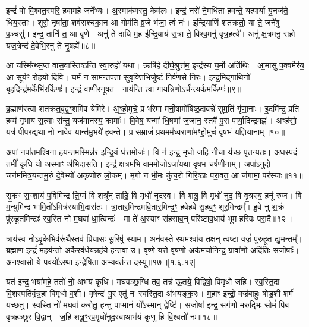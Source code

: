 इन्द्रं॑ वो वि॒श्वत॒स्परि॒ हवा॑महे॒ जने᳚भ्यः। अ॒स्माक॑मस्तु॒ केव॑लः। इन्द्रं॒ नरो॑ ने॒मधि॑ता हवन्ते॒ यत्पार्या॑ यु॒नज॑ते॒ धिय॒स्ताः। शूरो॒ नृषा॑ता॒ शव॑सश्चका॒न आ गोम॑ति व्र॒जे भ॑जा॒ त्वं नः॑। इ॒न्द्रि॒याणि॑ शतक्रतो॒ या ते॒ जने॑षु प॒ञ्चसु॑। इन्द्र॒ तानि॑ त॒ आ वृ॑णे। अनु॑ ते दायि म॒ह इ॑न्द्रि॒याय॑ स॒त्रा ते॒ विश्व॒मनु॑ वृत्र॒हत्ये᳚। अनु॑ क्ष॒त्रमनु॒ सहो॑ यज॒त्रेन्द्र॑ दे॒वेभि॒रनु॑ ते नृ॒षह्ये᳚॥८॥

आ यस्मि᳚न्थ्स॒प्त वा॑स॒वास्तिष्ठ॑न्ति स्वा॒रुहो॑ यथा। ऋषि॑र्\mbox{}ह दीर्घ॒श्रुत्त॑म॒ इन्द्र॑स्य घ॒र्मो अति॑थिः। आ॒मासु॑ प॒क्वमैर॑य॒ आ सूर्यꣳ॑ रोहयो दि॒वि। घ॒र्मं न साम॑न्तपता सुवृ॒क्तिभि॒र्जुष्टं॒ गिर्व॑णसे॒ गिरः॑। इन्द्र॒मिद्गा॒थिनो॑ बृ॒हदिन्द्र॑म॒र्केभि॑र॒र्किणः॑। इन्द्रं॒ वाणी॑रनूषत। गाय॑न्ति त्वा गाय॒त्रिणोऽर्च॑न्त्य॒र्कम॒र्किणः॑॥९॥

 ब्र॒ह्माण॑स्त्वा शतक्रत॒वुद्व॒ꣳ॒शमि॑व येमिरे। अ॒ꣳ॒हो॒मुचे॒ प्र भ॑रेमा मनी॒षामो॑षिष्ठ॒दावन्ने॑ सुम॒तिं गृ॑णा॒नाः। इ॒दमि॑न्द्र॒ प्रति॑ ह॒व्यं गृ॑भाय स॒त्याः स॑न्तु॒ यज॑मानस्य॒ कामाः᳚। वि॒वेष॒ यन्मा॑ धि॒षणा॑ ज॒जान॒ स्तवै॑ पु॒रा पार्या॒दिन्द्र॒मह्नः॑। अꣳह॑सो॒ यत्र॑ पी॒पर॒द्यथा॑ नो ना॒वेव॒ यान्त॑मु॒भये॑ हवन्ते। प्र स॒म्राजं॑ प्रथ॒मम॑ध्व॒राणा॑मꣳहो॒मुचं॑ वृष॒भं य॒ज्ञिया॑नाम्॥१०॥
 
अ॒पां नपा॑तमश्विना॒ हय॑न्तम॒स्मिन्न॑र इन्द्रि॒यं ध॑त्त॒मोजः॑। वि न॑ इन्द्र॒ मृधो॑ जहि नी॒चा य॑च्छ पृतन्य॒तः। अ॒ध॒स्प॒दं तमीं᳚ कृधि॒ यो अ॒स्माꣳ अ॑भि॒दास॑ति। इन्द्र॑ क्ष॒त्रम॒भि वा॒ममोजोऽजा॑यथा वृषभ चर्\mbox{}षणी॒नाम्। अपा॑ऽनुदो॒ जन॑ममित्र॒यन्त॑मु॒रुं दे॒वेभ्यो॑ अकृणोरु लो॒कम्। मृ॒गो न भी॒मः कु॑च॒रो गि॑रि॒ष्ठाः प॑रा॒वत॒ आ ज॑गामा॒ पर॑स्याः॥११॥
 
   सृ॒कꣳ स॒ꣳ॒शाय॑ प॒विमि॑न्द्र ति॒ग्मं वि शत्रू᳚न् ताढि॒ वि मृधो॑ नुदस्व। वि शत्रू॒\an{} वि मृधो॑ नुद॒ वि वृ॒त्रस्य॒ हनू॑ रुज। वि म॒न्युमि॑न्द्र भामि॒तो॑ऽमित्र॑स्याभि॒दास॑तः। त्रा॒तार॒मिन्द्र॑मवि॒तार॒मिन्द्र॒ꣳ॒ हवे॑हवे सु॒हव॒ꣳ॒ शूर॒मिन्द्रम्᳚। हु॒वे नु श॒क्रं पु॑रुहू॒तमिन्द्रꣴ॑ स्व॒स्ति नो॑ म॒घवा॑ धा॒त्विन्द्रः॑। मा ते॑ अ॒स्याꣳ स॑हसाव॒न् परि॑ष्टाव॒धाय॑ भूम हरिवः परा॒दै॥१२॥ 
   
   त्राय॑स्व नोऽवृ॒केभि॒र्वरू॑थै॒स्तव॑ प्रि॒यासः॑ सू॒रिषु॑ स्याम। अन॑वस्ते॒ रथ॒मश्वा॑य तक्ष॒न् त्वष्टा॒ वज्रं॑ पुरुहूत द्यु॒मन्तम्᳚। ब्र॒ह्माण॒ इन्द्रं॑ म॒हय॑न्तो अ॒र्कैरव॑र्धय॒न्नह॑ये॒ हन्त॒वा उ॑। वृष्णे॒ यत्ते॒ वृष॑णो अ॒र्कमर्चा॒निन्द्र॒ ग्रावा॑णो॒ अदि॑तिः स॒जोषाः᳚। अ॒न॒श्वासो॒ ये प॒वयो॑ऽर॒था इन्द्रे॑षिता अ॒भ्यव॑र्तन्त॒ दस्यू\sn{}॥१७॥[१.६.१२]


यत॑ इन्द्र॒ भया॑महे॒ ततो॑ नो॒ अभ॑यं कृधि।
मघ॑वञ्छ॒ग्धि तव॒ तन्न॑ ऊ॒तये॒ विद्विषो॒ विमृधो॑ जहि।
स्व॒स्ति॒दा वि॒शस्पति॑र्वृत्र॒हा विमृधो॑ व॒शी।
वृषेन्द्रः॑ पु॒र एतु॑ नः स्वस्ति॒दा अ॑भयङ्क॒रः।
म॒हाꣳ इन्द्रो॒ वज्र॑बाहुः षोड॒शी शर्म॑ यच्छतु।
स्व॒स्ति नो॑ म॒घवा॑ करोतु॒ हन्तु॑ पा॒प्मानं॒ यो᳚ऽस्मान्‌ द्वेष्टि॑।
स॒जोषा॑ इन्द्र॒ सग॑णो म॒रुद्भिः॒ सोमं॑ पिब वृत्रहञ्छूर वि॒द्वान्‌।
ज॒हि शत्रू॒ꣳ॒रप॒मृधो॑नुद॒स्वाथाभ॑यं कृणु हि वि॒श्वतो॑ नः॥१८॥

